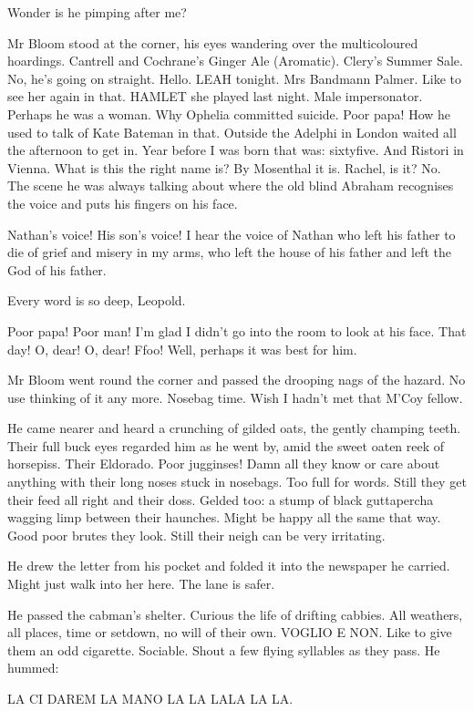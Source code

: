 Wonder is he pimping after me?

Mr Bloom stood at the corner, his eyes wandering over the multicoloured
hoardings. Cantrell and Cochrane's Ginger Ale (Aromatic). Clery's Summer
Sale. No, he's going on straight. Hello. LEAH tonight. Mrs Bandmann
Palmer. Like to see her again in that. HAMLET she played last night. Male
impersonator. Perhaps he was a woman. Why Ophelia committed suicide. Poor
papa! How he used to talk of Kate Bateman in that. Outside the Adelphi in
London waited all the afternoon to get in. Year before I was born that
was: sixtyfive. And Ristori in Vienna. What is this the right name is? By
Mosenthal it is. Rachel, is it? No. The scene he was always talking about
where the old blind Abraham recognises the voice and puts his fingers on
his face.

Nathan's voice! His son's voice! I hear the voice of Nathan who left his
father to die of grief and misery in my arms, who left the house of his
father and left the God of his father.

Every word is so deep, Leopold.

Poor papa! Poor man! I'm glad I didn't go into the room to look at his
face. That day! O, dear! O, dear! Ffoo! Well, perhaps it was best for
him.

Mr Bloom went round the corner and passed the drooping nags of the
hazard. No use thinking of it any more. Nosebag time. Wish I hadn't met
that M'Coy fellow.

He came nearer and heard a crunching of gilded oats, the gently champing
teeth. Their full buck eyes regarded him as he went by, amid the sweet
oaten reek of horsepiss. Their Eldorado. Poor jugginses! Damn all they
know or care about anything with their long noses stuck in nosebags. Too
full for words. Still they get their feed all right and their doss.
Gelded too: a stump of black guttapercha wagging limp between their
haunches. Might be happy all the same that way. Good poor brutes they
look. Still their neigh can be very irritating.

He drew the letter from his pocket and folded it into the newspaper he
carried. Might just walk into her here. The lane is safer.

He passed the cabman's shelter. Curious the life of drifting cabbies. All
weathers, all places, time or setdown, no will of their own. VOGLIO E
NON. Like to give them an odd cigarette. Sociable. Shout a few flying
syllables as they pass. He hummed:


    LA CI DAREM LA MANO
    LA LA LALA LA LA.


